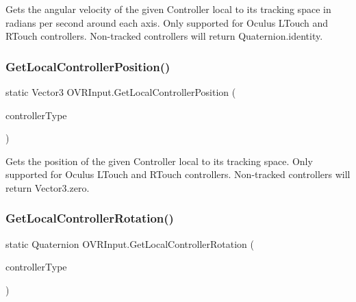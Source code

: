 Gets the angular velocity of the given Controller local to its tracking space in radians per second around each axis. Only supported for Oculus L\+Touch and R\+Touch controllers. Non-\/tracked controllers will return Quaternion.\+identity. 

\mbox{\label{class_o_v_r_input_aaf856370bc93d972ca00b9777e137493}} 
\subsubsection{\texorpdfstring{Get\+Local\+Controller\+Position()}{GetLocalControllerPosition()}}
{\footnotesize\ttfamily static Vector3 O\+V\+R\+Input.\+Get\+Local\+Controller\+Position (\begin{DoxyParamCaption}\item[{\mbox{\hyperlink{class_o_v_r_input_a5c86f9052a9cbb0b73779ff5704d60a8}{O\+V\+R\+Input.\+Controller}}}]{controller\+Type }\end{DoxyParamCaption})\hspace{0.3cm}{\ttfamily [static]}}



Gets the position of the given Controller local to its tracking space. Only supported for Oculus L\+Touch and R\+Touch controllers. Non-\/tracked controllers will return Vector3.\+zero. 

\mbox{\label{class_o_v_r_input_ae2f486b9046928c9e82bf8cbc68054e6}} 
\subsubsection{\texorpdfstring{Get\+Local\+Controller\+Rotation()}{GetLocalControllerRotation()}}
{\footnotesize\ttfamily static Quaternion O\+V\+R\+Input.\+Get\+Local\+Controller\+Rotation (\begin{DoxyParamCaption}\item[{\mbox{\hyperlink{class_o_v_r_input_a5c86f9052a9cbb0b73779ff5704d60a8}{O\+V\+R\+Input.\+Controller}}}]{controller\+Type }\end{DoxyParamCaption})\hspace{0.3cm}{\ttfamily [static]}}



